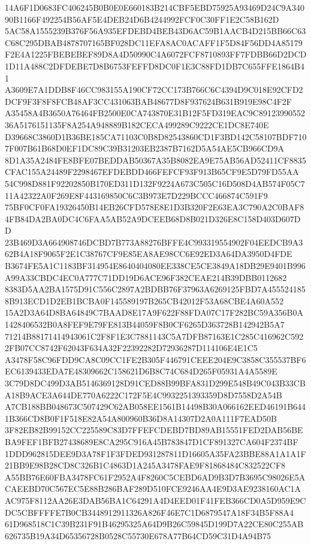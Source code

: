 \documentclass[UTF8,fontset=fandol,zihao=-4,a4paper]{ctexart}
\begin{document}
{{14A6F1D0683FC406245B0B0E0E660183B214CBF5EBD75925A93469D24C9A34090B1166F492254B56AF5E4DEB24D6B4244992FCF0C30FF1E2C58B162D
5AC58A1555239B376F56A935EFDEBD4BEB43D6AC59B1AACB4D215BB66C63C68C295DBAB4878707165BF028DC11EFA8AC0ACAFF1F5D84F56DD4A85179
F2E4A1225FBEBEBEF89D8A4D50990C4A6072FCF8710893FF7FDBB66D2DCD1D11A488C2DFDEBE7D8B6753FEFFD8DC0F1E3C88FD1DB7C655FFE1864B41
A3609E7A1DDB8F46CC983155A190CF72CC173B766C6C4394D9C018E92CFD2DCF9F3F8F8FCB48AF3CC431063BAB48677D8F937624B631B919E98C4F2F
A35458A4B3650A76464FB2500E0CA743870E31B12F5FD319EAC9C8912399055236A5176151135F8A254A948889B182CECA499289C9222CE1DC8E740E
D39668C3860D1B36BE185CA71103C0B8D82543860CD1F3BD142C58107BDF7107F007B61B68D0EF1DC89C39B31203EB2387B7162D5A54AE5CB966CD9A
8D1A35A2484FE8BFE07BEDDAB50367A35B8082EA9E75AB56AD52411CF8835CFAC155A24489F2298467EFDEBDD466FEFCF93F913B65CF9E5D79FD55AA
54C998D881F92202850B170ED311D132F9224A673C505C16D508D4AB574F05C711A42322A0F269E8F443169850C6C3B973E7D229BCCC466874C591F9
75BF0CF0FA19326450B14EB26CFD578E8E1D3B320F2E63EA3C790A2C0BAF84FB84DA2BA0DC4C6FAA5AB52A9DCEEB68D8B021D326E8C158D403D607DD
23B469D3A664908746DCBD7B773A88276BFFE4C993319554902F04EEDCB9A362B4A18F9065F2E1C38767CF9E85EA8AE98CC6E92ED3A64DA3950D4FDE
B3674FE5A1C1183BF314954E8640404080EE338CE5CE3849A18DB29E9401B996A99A33CBDC4EC0A777C71DD19D6ACE96F382CEAE214B39DBB0112682
8383D5AA2BA1575D91C556C2897A2BDBB76F37963A6269125FBD7A4555241858B913ECD1D2EB1BCBA0F145589197B265CB42012F53A68CBE4A60A552
15A2D3A64D8BA64849C7BAAD8E17A9F622F88FDA07C17F282BC59A356B0A1428406532B0A8FEF9E79FE813B44059F8B0CF6265D363728B142942B5A7
71214B88171414943061C2F8F1E3C7881143C5A7DFB87163E1C285C416962C5922FB07CC8742F62043F634A32F22392282D72936287D114106E4E1C5
A3478F58C96FDD9CA8C09CC1FE2B305F446791CEEE204E9C3858C355537BF6EC6139433EDA7E48309662C158621D6B8C74C684D265F05931A4A5589E
3C79D8DC499D3AB5146369128D91CED88B99BFA831D299E548B49C043B33CBA18B9ACE3A644DE770A6222C172F5E4C9932251393359D8D7558D2A54B
A7CB188BB048673C507429C62AB058EE1561B14498B30A066162EED46191B6441B366CD8B0F1F518E82A54A800960B36D8A14307D2A0A111F7EAD50B
3F82EB82B99152CC225589C83D7FFEFCDEBD7BD89AB15551FED2DAB56BEBA9FEF1BFB27438689E8CA295C916A45B783847D1CF891327CA604F2374BF
1DDD962815DEE9D3A78F1F3FDED931287811D16605A35FA23BBE88A1A1A1F21BB9E98B28CD8C326B1C4863D1A245A3478FAE9F81868484C832522CF8
A55BB76E60FBA3478FC61F2952A4F8260C5CEBD6AD9B3D7B3695C98026E5ACAEEBD70C567EC5E88B286BAF289D510FCE9246AA4E9D3AE9238160AC1A
AC975F8112AA26E3DAB56BA1C64291A4D4EED01F41FEB366CD0A5D959E9CDC5CBFFFFE7B0CB3448912911326A826F46E7C1D6879547A18F34B5F88A4
61D968518C1C39B231F91B46295325A64D9B26C59845D199D7A22CE80C255AB626735B19A34D65356728B0528C55730E678A77B64CD59C31D4A94B75
}}
\end{document}
